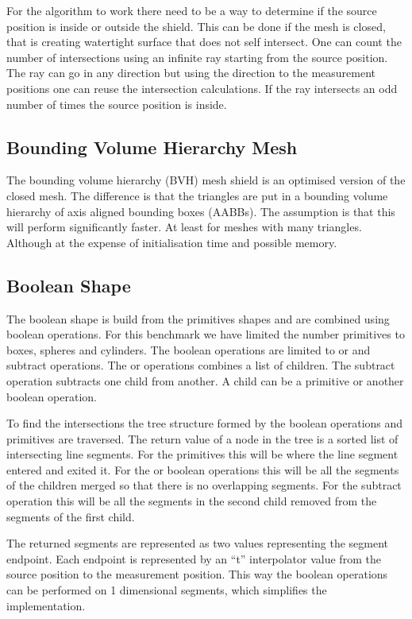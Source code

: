 \documentclass[11pt,twoside,a4paper]{report}
\begin{document}
For the algorithm to work there need to be a way to determine if the source position is inside or outside the shield. This can be done if the mesh is closed, that is creating watertight surface that does not self intersect. One can count the number of intersections using an infinite ray starting from the source position. The ray can go in any direction but using the direction to the measurement positions one can reuse the intersection calculations. If the ray intersects an odd number of times the source position is inside.

\subsection{Bounding Volume Hierarchy Mesh}
The bounding volume hierarchy (BVH) mesh shield is an optimised version of the closed mesh. The difference is that the triangles are put in a bounding volume hierarchy of axis aligned bounding boxes (AABBs). The assumption is that this will perform significantly faster. At least for meshes with many triangles. Although at the expense of initialisation time and possible memory.

\subsection{Boolean Shape}
The boolean shape is build from the primitives shapes and are combined using boolean operations. For this benchmark we have limited the number primitives to boxes, spheres and cylinders. The boolean operations are limited to or and subtract operations. The or operations combines a list of children. The subtract operation subtracts one child from another. A child can be a primitive or another boolean operation.

To find the intersections the tree structure formed by the boolean operations and primitives are traversed. The return value of a node in the tree is a sorted list of intersecting line segments. For the primitives this will be where the line segment entered and exited it. For the or boolean operations this will be all the segments of the children merged so that there is no overlapping segments. For the subtract operation this will be all the segments in the second child removed from the segments of the first child.

The returned segments are represented as two values representing the segment endpoint. Each endpoint is represented by an “t” interpolator value from the source position to the measurement position. This way the boolean operations can be performed on 1 dimensional segments, which simplifies the implementation.
\end{document}
